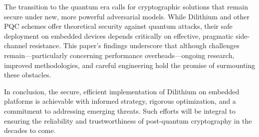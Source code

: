 The transition to the quantum era calls for cryptographic solutions that remain secure under new, more powerful adversarial models. While Dilithium and other PQC schemes offer theoretical security against quantum attacks, their safe deployment on embedded devices depends critically on effective, pragmatic side-channel resistance. This paper’s findings underscore that although challenges remain—particularly concerning performance overheads—ongoing research, improved methodologies, and careful engineering hold the promise of surmounting these obstacles.

In conclusion, the secure, efficient implementation of Dilithium on embedded platforms is achievable with informed strategy, rigorous optimization, and a commitment to addressing emerging threats. Such efforts will be integral to ensuring the reliability and trustworthiness of post-quantum cryptography in the decades to come.

